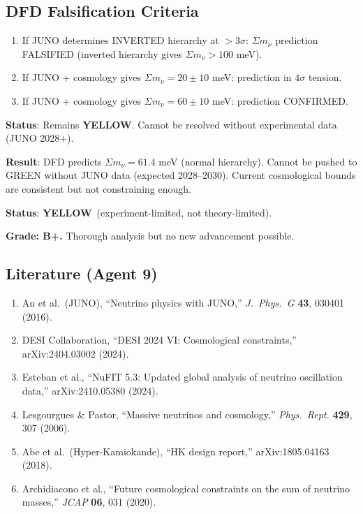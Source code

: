 \documentclass[11pt,a4paper]{article}
\newcommand{\YELLOW}{\textcolor{dfdyellow}{\textbf{YELLOW}}}
\begin{document}
\subsection{DFD Falsification Criteria}

\begin{enumerate}
\item If JUNO determines INVERTED hierarchy at $> 3\sigma$: $\Sigma m_\nu$ prediction FALSIFIED (inverted hierarchy gives $\Sigma m_\nu > 100$ meV).
\item If JUNO + cosmology gives $\Sigma m_\nu = 20 \pm 10$ meV: prediction in $4\sigma$ tension.
\item If JUNO + cosmology gives $\Sigma m_\nu = 60 \pm 10$ meV: prediction CONFIRMED.
\end{enumerate}

\textbf{Status}: Remains \YELLOW. Cannot be resolved without experimental data (JUNO 2028+).

\begin{tcolorbox}[colback=yellow!5!white, colframe=yellow!60!black, title={Agent 9: $\Sigma m_\nu$ --- WAITING FOR JUNO}]
\textbf{Result}: DFD predicts $\Sigma m_\nu = 61.4$ meV (normal hierarchy). Cannot be pushed to GREEN without JUNO data (expected 2028--2030). Current cosmological bounds are consistent but not constraining enough.

\textbf{Status}: \YELLOW\ (experiment-limited, not theory-limited).

\textbf{Grade: B+.} Thorough analysis but no new advancement possible.
\end{tcolorbox}

\subsection{Literature (Agent 9)}

\begin{enumerate}
\item An et al.\ (JUNO), ``Neutrino physics with JUNO,'' \textit{J.\ Phys.\ G} \textbf{43}, 030401 (2016).
\item DESI Collaboration, ``DESI 2024 VI: Cosmological constraints,'' arXiv:2404.03002 (2024).
\item Esteban et al., ``NuFIT 5.3: Updated global analysis of neutrino oscillation data,'' arXiv:2410.05380 (2024).
\item Lesgourgues \& Pastor, ``Massive neutrinos and cosmology,'' \textit{Phys.\ Rept.} \textbf{429}, 307 (2006).
\item Abe et al.\ (Hyper-Kamiokande), ``HK design report,'' arXiv:1805.04163 (2018).
\item Archidiacono et al., ``Future cosmological constraints on the sum of neutrino masses,'' \textit{JCAP} \textbf{06}, 031 (2020).
\end{enumerate}
\end{document}

